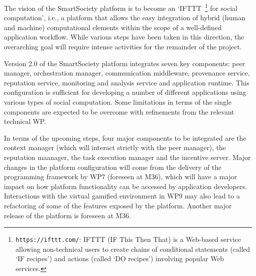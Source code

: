 The vision of the SmartSociety platform is to become an `IFTTT~\footnote{{\tt https://ifttt.com/}: IFTTT (IF This Then That) is a Web-based service allowing non-technical users to create chains of conditional statements (called `IF recipes') and actions (called `DO recipes') involving popular Web services.} for social computation', i.e., a platform that allows the easy integration of hybrid (human and machine) computational elements within the scope of a well-defined application workflow. While various steps have been taken in this direction, the overarching goal will require intense activities for the remainder of the project. 

Version 2.0 of the SmartSociety platform integrates seven key components: peer manager, orchestration manager, communication middleware, provenance service, reputation service, monitoring and analysis service and application runtime. This configuration is sufficient for developing a number of different applications using various types of social computation. Some limitations in terms of the single components are expected to be overcome with refinements from the relevant technical WP.

In terms of the upcoming steps, four major components to be integrated are the context manager (which will interact strictly with the peer manager), the reputation maanager, the task execution manager and the incentive server. Major changes in the platform configuration will come from the delivery of the programming framework by WP7 (foreseen at M36), which will have a major impact on how platform functionality can be accessed by application developers. Interactions with the virtual gamified environment in WP9 may also lead to a refactoring of some of the features exposed by the platform. Another major release of the platform is foreseen at M36. 

